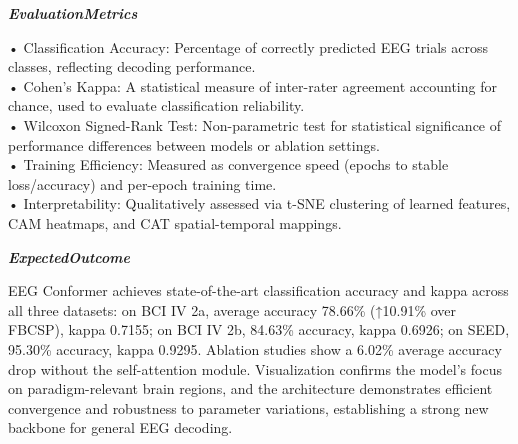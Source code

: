 \begin{tcolorbox}[
    breakable,
    title={Example of Idea Generation in Neuroscience},
    colback=LighterGray,
    colframe=DeepPurple,
    colbacktitle=DeepPurple,
    coltitle=White,
]
\textbf{\emph{\textcolor{CaseOrange}{EvaluationMetrics}}}

• Classification Accuracy: Percentage of correctly predicted EEG trials across classes, reflecting decoding performance. \\
• Cohen's Kappa: A statistical measure of inter-rater agreement accounting for chance, used to evaluate classification reliability. \\
• Wilcoxon Signed-Rank Test: Non-parametric test for statistical significance of performance differences between models or ablation settings. \\
• Training Efficiency: Measured as convergence speed (epochs to stable loss/accuracy) and per-epoch training time. \\
• Interpretability: Qualitatively assessed via t-SNE clustering of learned features, CAM heatmaps, and CAT spatial-temporal mappings. 

\textbf{\emph{\textcolor{CaseOrange}{ExpectedOutcome}}}

EEG Conformer achieves state-of-the-art classification accuracy and kappa across all three datasets:
on BCI IV 2a, average accuracy 78.66\% (↑10.91\% over FBCSP), kappa 0.7155; on BCI IV 2b, 84.63\%
accuracy, kappa 0.6926; on SEED, 95.30\% accuracy, kappa 0.9295. Ablation studies show a 6.02\%
average accuracy drop without the self-attention module. Visualization confirms the model's focus on
paradigm-relevant brain regions, and the architecture demonstrates efficient convergence and
robustness to parameter variations, establishing a strong new backbone for general EEG decoding.

\end{tcolorbox}



